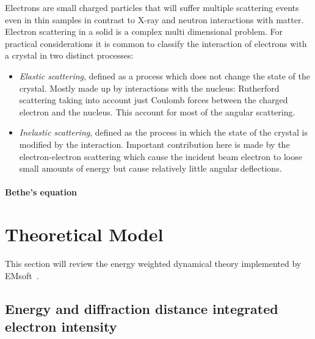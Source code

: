Electrons are small charged particles that will suffer multiple scattering events even in thin samples in contrast to X-ray and neutron interactions with matter. Electron scattering in a solid is a complex multi dimensional problem. For practical considerations it is common to classify the interaction of electrons with a crystal in two distinct processes:
\begin{itemize}
\item \textit{Elastic scattering}, defined as a process which does not change the state of the crystal. Mostly made up by interactions with the nucleus: Rutherford scattering taking into account just Coulomb forces between the charged electron and the nucleus. This account for most of the angular scattering.


\item \textit{Inelastic scattering}, defined as the process in which the state of the crystal is modified by the interaction. Important contribution here is made by the electron-electron scattering which cause the incident beam electron to loose small amounts of energy but cause relatively little angular deflections.
\end{itemize}



\paragraph{Bethe's equation}


\section{Theoretical Model}
\label{sec:TKDtheory}

This section will review the energy weighted dynamical theory implemented by EMsoft~\cite{EMsoft}.

%
\subsection{Energy and diffraction distance integrated electron intensity}
\label{sec:energy_weight}



